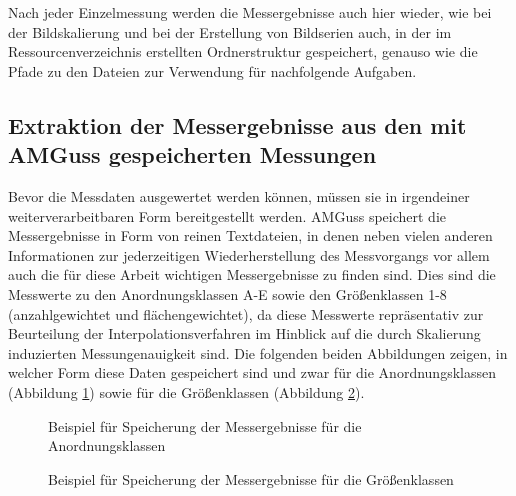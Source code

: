 \documentclass[
fontsize=10pt, 
listof = totoc,
parskip = half	
]{report}
\begin{document}
\noindent Nach jeder Einzelmessung werden die Messergebnisse auch hier wieder, wie bei der Bildskalierung und bei der Erstellung von Bildserien auch, in der im Ressourcenverzeichnis erstellten Ordnerstruktur gespeichert, genauso wie die Pfade zu den Dateien zur Verwendung für nachfolgende Aufgaben.

\subsection{Extraktion der Messergebnisse aus den mit AMGuss gespeicherten Messungen}
\label{subsec:FlowExtraktionMessergebnisse}

Bevor die Messdaten ausgewertet werden können, müssen sie in irgendeiner weiterverarbeitbaren Form bereitgestellt werden. AMGuss speichert die Messergebnisse in Form von reinen Textdateien, in denen neben vielen anderen Informationen zur jederzeitigen Wiederherstellung des Messvorgangs vor allem auch die für diese Arbeit wichtigen Messergebnisse zu finden sind. Dies sind die Messwerte zu den Anordnungsklassen A-E sowie den Größenklassen 1-8 (anzahlgewichtet und flächengewichtet), da diese Messwerte repräsentativ zur Beurteilung der Interpolationsverfahren im Hinblick auf die durch Skalierung induzierten Messungenauigkeit sind. Die folgenden beiden Abbildungen zeigen, in welcher Form diese Daten gespeichert sind und zwar für die Anordnungsklassen (Abbildung \ref{fig:KlassifikationsergebnisseAkl}) sowie für die Größenklassen (Abbildung \ref{fig:KlassifikationsergebnisseGK}).

\begin{figure}[H]
	\centering
	\caption{Beispiel für Speicherung der Messergebnisse für die Anordnungsklassen}
	\label{fig:KlassifikationsergebnisseAkl}
\end{figure}

\begin{figure}[H]
	\centering
	\caption{Beispiel für Speicherung der Messergebnisse für die Größenklassen}
	\label{fig:KlassifikationsergebnisseGK}
\end{figure}
\end{document}
